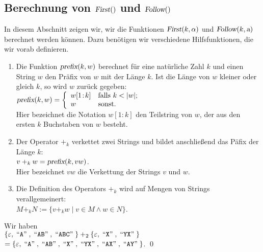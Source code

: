 \subsection{Berechnung von $\textsl{First}()$ und $\textsl{Follow}()$}
In diesem Abschnitt zeigen wir, wir die Funktionen $\textsl{First}(k, \alpha)$ und
$\textsl{Follow}(k, \textsl{a})$ berechnet werden können.  Dazu benötigen wir verschiedene
Hilfsfunktionen, die wir vorab definieren.
\begin{enumerate}
\item Die Funktion $\textsl{prefix}(k, w)$ berechnet für eine natürliche Zahl $k$
      und einen String $w$ den Präfix von $w$ mit der Länge $k$.  Ist die Länge von $w$
      kleiner oder gleich $k$, so wird $w$ zurück gegeben:
      \\[0.2cm]
      \hspace*{1.3cm}
      $\textsl{prefix}(k, w) = \left\{
       \begin{array}{ll}
         w[1\!:\!k]  & \mbox{falls $k < |w|$;}  \\
         w       & \mbox{sonst.}
       \end{array}
       \right.
      $
      \\[0.2cm]
      Hier bezeichnet die Notation $w[1\!:\!k]$ den Teilstring von $w$, der 
      aus den ersten $k$ Buchstaben von $w$ besteht.
\item Der Operator $+_k$ verkettet zwei Strings und bildet anschließend das Päfix der
      Länge $k$:
      \\[0.2cm]
      \hspace*{1.3cm}
      $v +_k w = \textsl{prefix}(k, vw)$.
      \\[0.2cm]
      Hier bezeichnet $vw$ die Verkettung der Strings $v$ und $w$.
\item Die Definition des Operators $+_k$ wird auf Mengen von Strings verallgemeinert:
      \\[0.2cm]
      \hspace*{1.3cm}
      $M +_k N := \{ v +_k w \mid v \in M \wedge w \in N \}$.
\end{enumerate}

\example
Wir haben
\\[0.2cm]
\hspace*{1.7cm}
$\{ \varepsilon, \;\mbox{``\texttt{A}''}\;, \;\mbox{``\texttt{AB}''}\;, \;\mbox{``\texttt{ABC}''}\; \} +_2 
 \{ \varepsilon, \;\mbox{``\texttt{X}''}\;, \;\mbox{``\texttt{YX}''}\; \} $
\\[0.2cm]
\hspace*{1.3cm}
$= \{ \varepsilon, \;\mbox{``\texttt{A}''}\;, \;\mbox{``\texttt{AB}''}\;, \;\mbox{``\texttt{X}''}\;, \;\mbox{``\texttt{YX}''}\;,
    \;\mbox{``\texttt{AX}''}\;, \;\mbox{``\texttt{AY}''}\; \}
$. \qed
\vspace*{0.2cm}


